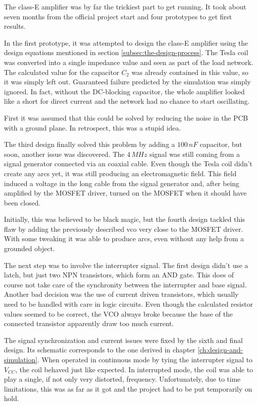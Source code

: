 The class-E amplifier was by far the trickiest part to get running. It took about seven months from the official project start and four prototypes to get first results.

In the first prototype, it was attempted to design the class-E amplifier using the design equations mentioned in section \ref{subsec:the-design-process}. The Tesla coil was converted into a single impedance value and seen as part of the load network. The calculated value for the capacitor \(C_2\) was already contained in this value, so it was simply left out. Guaranteed failure predicted by the simulation was simply ignored. In fact, without the DC-blocking capacitor, the whole amplifier looked like a short for direct current and the network had no chance to start oscillating.

First it was assumed that this could be solved by reducing the noise in the PCB with a ground plane. In retrospect, this was a stupid idea.

The third design finally solved this problem by adding a \(100\,nF\) capacitor, but soon, another issue was discovered. The \(4\,MHz\) signal was still coming from a signal generator connected via an coaxial cable. Even though the Tesla coil didn't create any arcs yet, it was still producing an electromagnetic field. This field induced a voltage in the long cable from the signal generator and, after being amplified by the MOSFET driver, turned on the MOSFET when it should have been closed.

Initially, this was believed to be black magic, but the fourth design tackled this flaw by adding the previously described \gls{vco} very close to the MOSFET driver. With some tweaking it was able to produce arcs, even without any help from a grounded object.

The next step was to involve the interrupter signal. The first design didn't use a latch, but just two NPN transistors, which form an AND gate. This does of course not take care of the synchronity between the interrupter and base signal. Another bad decision was the use of current driven transistors, which usually need to be handled with care in logic circuits. Even though the calculated resistor values seemed to be correct, the VCO always broke because the base of the connected transistor apparently draw too much current.

The signal synchronization and current issues were fixed by the sixth and final design. Its schematic corresponds to the one derived in chapter \ref{ch:design-and-simulation}. When operated in continuous mode by tying the interrupter signal to \(V_{CC}\), the coil behaved just like expected. In interrupted mode, the coil was able to play a single, if not only very distorted, frequency. Unfortunately, due to time limitations, this was as far as it got and the project had to be put temporarily on hold.

